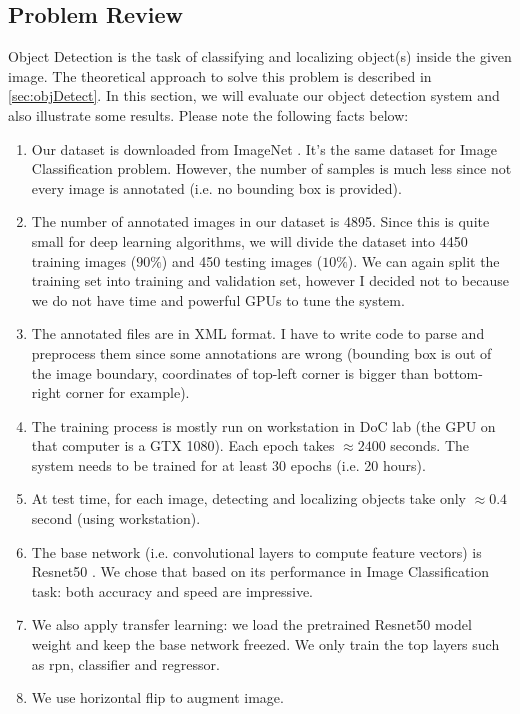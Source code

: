 \subsection{Problem Review}
Object Detection is the task of classifying and localizing object(s) inside the given image. The theoretical approach to solve this problem is described in \ref{sec:objDetect}. In this section, we will evaluate our object detection system and also illustrate some results. Please note the following facts below:
\begin{enumerate}
	\item Our dataset is downloaded from ImageNet \cite{imagenet_cvpr09}. It's the same dataset for Image Classification problem. However, the number of samples is much less since not every image is annotated (i.e. no bounding box is provided).
	\item The number of annotated images in our dataset is 4895. Since this is quite small for deep learning algorithms, we will divide the dataset into 4450 training images ($90\%$) and 450 testing images ($10\%$). We can again split the training set into training and validation set, however I decided not to because we do not have time and powerful GPUs to tune the system.
	\item The annotated files are in XML format. I have to write code to parse and preprocess them since some annotations are wrong (bounding box is out of the image boundary, coordinates of top-left corner is bigger than bottom-right corner for example).
	\item The training process is mostly run on  workstation in DoC lab (the GPU on that computer is a GTX 1080). Each epoch takes $\approx 2400$ seconds. The system needs to be trained for at least 30 epochs (i.e. 20 hours).
	\item At test time, for each image, detecting and localizing objects take only $\approx 0.4$ second (using  workstation).
	\item The base network (i.e. convolutional layers to compute feature vectors) is Resnet50 \cite{DBLP:journals/corr/HeZRS15}. We chose that based on its performance in Image Classification task: both accuracy and speed are impressive.
	\item We also apply transfer learning: we load the pretrained Resnet50 model weight and keep the base network freezed. We only train the top layers such as rpn, classifier and regressor.
	\item We use horizontal flip to augment image.
\end{enumerate}

